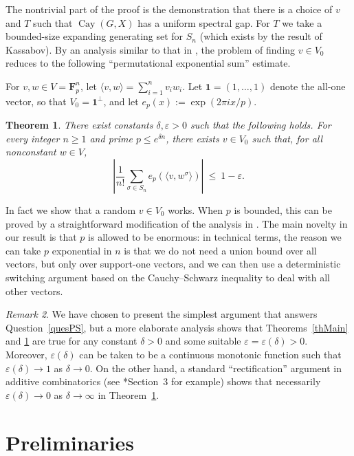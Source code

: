 \documentclass[11pt]{amsart}
\numberwithin{equation}{section}
\newtheorem{theorem}{Theorem}[section]
\theoremstyle{remark}
\newtheorem{remark}[theorem]{Remark}
\newcommand{\op}{\operatorname}
\newcommand{\Cay}{\op{Cay}}
\newcommand{\F}{\mathbf{F}}
\newcommand\br[1]{{\left(#1\right)}}
\newcommand{\gen}[1]{\langle{#1}\rangle}
\newcommand\eps{\varepsilon}
\def\one{\mathbf{1}}
\begin{document}
The nontrivial part of the proof is the demonstration that there is a choice of $v$ and $T$ such that $\Cay(G, X)$ has a uniform spectral gap.
For $T$ we take a bounded-size expanding generating set for $S_n$ (which exists by the result of Kassabov).
By an analysis similar to that in \cite{ALW01},
the problem of finding $v \in V_0$ reduces to the following ``permutational exponential sum'' estimate.

For $v, w \in V = \F_p^n$, let $\gen {v,w} = \sum_{i=1}^n v_i w_i$.
Let $\one = (1, \dots, 1)$ denote the all-one vector, so that $V_0 = \one^\perp$,
and let $e_p(x) := \exp(2 \pi i x / p)$.

\begin{theorem} \label{thExpSum}
    There exist constants $\delta, \eps >0$ such that the following holds.
    For every integer $n \ge 1$ and prime $p \le e^{\delta n}$,
    there exists $v \in V_0$ such that, for all nonconstant $w \in V$,
    \[
       \left| \frac1{n!} \sum_{\sigma \in S_n} e_p\br{\gen{v, w^\sigma}} \right|
        \> \le \> 1 - \eps.
    \]
\end{theorem}

In fact we show that a random $v \in V_0$ works.
When $p$ is bounded, this can be proved by a straightforward modification of the analysis in \cite{ALW01}.
The main novelty in our result is that $p$ is allowed to be enormous:
in technical terms, the reason we can take $p$ exponential in $n$ is that we do not need a union bound over all vectors,
but only over support-one vectors, and we can then use a deterministic switching argument based on the Cauchy--Schwarz inequality to deal with all other vectors.


\begin{remark}
    We have chosen to present the simplest argument that answers Question~\ref{quesPS}, but
    a more elaborate analysis shows that Theorems~\ref{thMain} and \ref{thExpSum} are true for any constant $\delta > 0$ and some suitable $\eps = \eps(\delta) > 0$.
    Moreover, $\eps(\delta)$ can be taken to be a continuous monotonic function such that $\eps(\delta) \to 1$ as $\delta \to 0$.
    On the other hand, a standard ``rectification'' argument in additive combinatorics (see \cite{BLR98}*{Section~3} for example) shows that necessarily $\eps(\delta) \to 0$ as $\delta \to \infty$ in Theorem~\ref{thExpSum}.
\end{remark}


\section{Preliminaries} \label{sec2}
\end{document}
